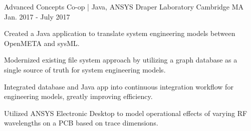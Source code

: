 \begin{cventries}
  \cventry
    {Advanced Concepts Co-op | Java, ANSYS} %
    {Draper Laboratory} %
    {Cambridge MA} %
    {Jan. 2017 - July 2017} %
    {
      \begin{cvitems} %
        \item {Created a Java application to translate system engineering models between OpenMETA and sysML.}
        \item {Modernized existing file system approach by utilizing a graph database as a single source of truth for system engineering models.}
        \item {Integrated database and Java app into continuous integration workflow for engineering models, greatly improving efficiency.}
        \item {Utilized ANSYS Electronic Desktop to model operational effects of varying RF wavelengths on a PCB based on trace dimensions.}
      \end{cvitems}
    }

\end{cventries}
